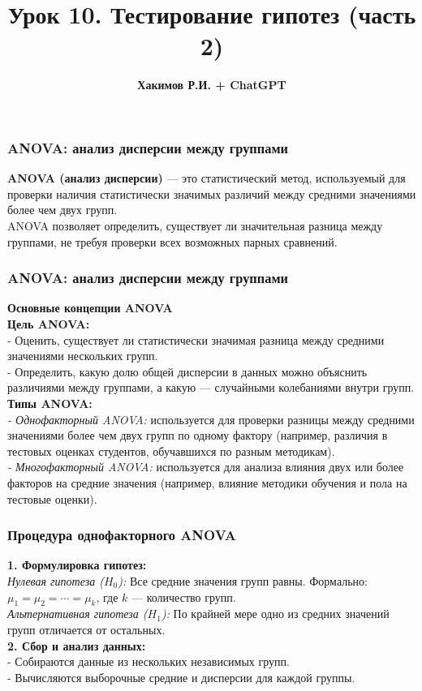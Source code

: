 \documentclass[aspectratio=169]{beamer}
\title{\bf Урок 10. Тестирование гипотез (часть 2)}
\author{{\bf Хакимов Р.И. + ChatGPT}}
\date[\today]{}
\begin{document}
\begin{frame}
\titlepage
\end{frame}

\begin{frame}
\frametitle{ANOVA: анализ дисперсии между группами}
{\bf ANOVA (анализ дисперсии)} — это статистический метод, используемый для проверки наличия статистически значимых различий между средними значениями более чем двух групп.\\
ANOVA позволяет определить, существует ли значительная разница между группами, не требуя проверки всех возможных парных сравнений.
\end{frame}

\begin{frame}
\frametitle{ANOVA: анализ дисперсии между группами}
{\bf Основные концепции ANOVA}
\newline\\
{\bf Цель ANOVA:}\\
- Оценить, существует ли статистически значимая разница между средними значениями нескольких групп.\\
- Определить, какую долю общей дисперсии в данных можно объяснить различиями между группами, а какую — случайными колебаниями внутри групп.
\newline\\
{\bf Типы ANOVA:}\\
{\it - Однофакторный ANOVA:} используется для проверки разницы между средними значениями более чем двух групп по одному фактору (например, различия в тестовых оценках студентов, обучавшихся по разным методикам).\\
{\it - Многофакторный ANOVA:} используется для анализа влияния двух или более факторов на средние значения (например, влияние методики обучения и пола на тестовые оценки).
\end{frame}

\begin{frame}
\frametitle{Процедура однофакторного ANOVA}
{\bf 1. Формулировка гипотез:}\\
{\it Нулевая гипотеза ($H_0$):} Все средние значения групп равны. Формально: \( \mu_1 = \mu_2 = \cdots = \mu_k \), где \( k \) — количество групп.\\
{\it Альтернативная гипотеза ($H_1$):} По крайней мере одно из средних значений групп отличается от остальных.\\
{\bf 2. Сбор и анализ данных:}\\
- Собираются данные из нескольких независимых групп.\\
- Вычисляются выборочные средние и дисперсии для каждой группы.\\
\end{frame}
\end{document}
